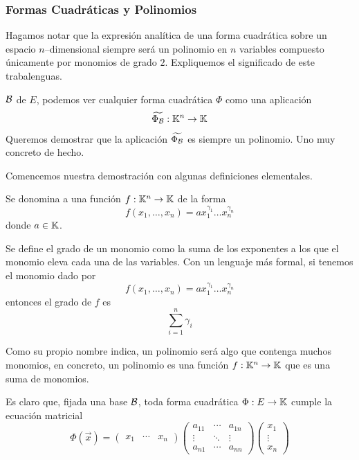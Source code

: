\subsubsection{Formas Cuadráticas y Polinomios}
Hagamos notar que la expresión analítica de una forma cuadrática sobre un espacio $n$--dimensional siempre será un polinomio en $n$ variables compuesto únicamente por monomios de grado $2$. Expliquemos el significado de este trabalenguas.

 $\mathcal{B}$ de $E$, podemos ver cualquier forma cuadrática $\Phi$ como una aplicación \[\widetilde{\Phi_{\mathcal{B}}}:\mathbb{K}^n\to\mathbb{K}\]
Queremos demostrar que la aplicación $\widetilde{\Phi_{\mathcal{B}}}$ es siempre un polinomio. Uno muy concreto de hecho.

Comencemos nuestra demostración con algunas definiciones elementales.
\begin{defi}[Monomio]
	Se donomina  a una función $f:\mathbb{K}^n\to\mathbb{K}$ de la forma
	\begin{equation*}f(x_1,\dots,x_n)=ax_1^{\gamma_1}\dots x_n^{\gamma_n}\end{equation*}
	donde $a\in\mathbb{K}$.
\end{defi}
\begin{defi}
	Se define el grado de un monomio como la suma de los exponentes a los que el monomio eleva cada una de las variables. Con un lenguaje más formal, si tenemos el monomio dado por \[f(x_1,\dots,x_n)=ax_1^{\gamma_1}\dots x_n^{\gamma_n}\] entonces el grado de $f$ es
	\[\sum_{i=1}^{n}\gamma_i\]
\end{defi}
\begin{defi}[Polinomio]
	Como su propio nombre indica, un polinomio será algo que contenga muchos monomios, en concreto, un polinomio es una función $f:\mathbb{K}^n\to\mathbb{K}$ que es una suma de monomios.
\end{defi}
Es claro que, fijada una base $\mathcal{B}$, toda forma cuadrática $\Phi:E\to\mathbb{K}$ cumple la ecuación matricial
\[\Phi(\vec{x})=\begin{pmatrix}
x_1 & \cdots & x_n
\end{pmatrix}\begin{pmatrix}
a_{11} & \cdots & a_{1n}\\
\vdots & \ddots & \vdots\\
a_{n1} & \cdots & a_{nn}
\end{pmatrix}\begin{pmatrix}
x_1\\
\vdots\\
x_n
\end{pmatrix}\]
